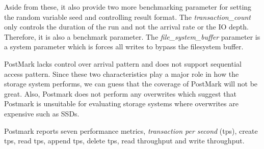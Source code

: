 Aside from these, it also provide two more benchmarking parameter for setting the random variable seed and controlling result format. 
The \emph{transaction\_count} only controls the duration of the run and not the arrival rate or the IO depth. 
Therefore, it is also a benchmark parameter. 
The \emph{file\_system\_buffer} parameter is a system parameter which is forces all writes to bypass the filesystem buffer.

PostMark lacks control over arrival pattern and does not support sequential access pattern. 
Since these two characteristics play a major role in how the storage system performs, we can guess that the coverage of PostMark will not be great. 
Also, Postmark does not perform any overwrites which suggest that Postmark is unsuitable for evaluating storage systems where overwrites are expensive such as SSDs.
 
Postmark reports seven performance metrics, \emph{transaction per second} (tps), create tps, read tps, append tps, delete tps, read throughput and write throughput. 
 
